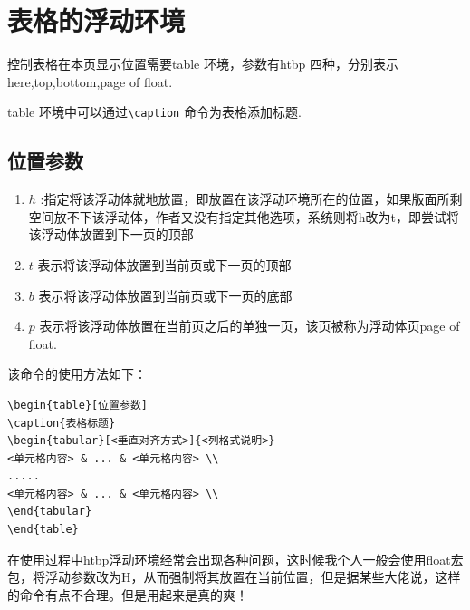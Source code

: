 \documentclass[cn,chinese,color=cyan]{elegantbook}
\begin{document}
\section{表格的浮动环境}
控制表格在本页显示位置需要table 环境，参数有htbp 四种，分别表示here,top,bottom,page of float.

table 环境中可以通过\verb|\caption| 命令为表格添加标题.

\subsection{位置参数}
\begin{enumerate}
	\item $h$ :指定将该浮动体就地放置，即放置在该浮动环境所在的位置，如果版面所剩空间放不下该浮动体，作者又没有指定其他选项，系统则将h改为t，即尝试将该浮动体放置到下一页的顶部
	
	\item $t$ 表示将该浮动体放置到当前页或下一页的顶部
	
	\item $b$ 表示将该浮动体放置到当前页或下一页的底部
	
	\item $p$ 表示将该浮动体放置在当前页之后的单独一页，该页被称为浮动体页page of float.
\end{enumerate}
该命令的使用方法如下：
\begin{lstlisting}[style=R]
\begin{table}[位置参数]
\caption{表格标题}
\begin{tabular}[<垂直对齐方式>]{<列格式说明>}
<单元格内容> & ... & <单元格内容> \\
.....
<单元格内容> & ... & <单元格内容> \\
\end{tabular}
\end{table}
\end{lstlisting}
\begin{note}
	在使用过程中htbp浮动环境经常会出现各种问题，这时候我个人一般会使用float宏包，将浮动参数改为H，从而强制将其放置在当前位置，但是据某些大佬说，这样的命令有点不合理。但是用起来是真的爽！
\end{note}
\end{document}
